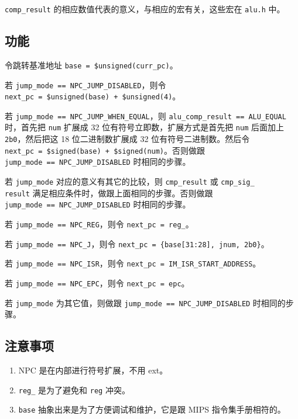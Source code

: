 \documentclass[12pt,AutoFakeBold,AutoFakeSlant]{article}
\providecommand{\tightlist}{%
  \setlength{\itemsep}{0pt}\setlength{\parskip}{0pt}}
\begin{document}
\texttt{comp\_result} 的相应数值代表的意义，与相应的宏有关，这些宏在
\texttt{alu.h} 中。

\hypertarget{ux529fux80fd}{%
\subsection{功能}\label{ux529fux80fd}}

令跳转基准地址 \texttt{base\ =\ \$unsigned(curr\_pc)}。

若 \texttt{jump\_mode\ ==\ NPC\_JUMP\_DISABLED}，则令
\texttt{next\_pc\ =\ \$unsigned(base)\ +\ \$unsigned(4)}。

若 \texttt{jump\_mode\ ==\ NPC\_JUMP\_WHEN\_EQUAL}，则
\texttt{alu\_comp\_result\ ==\ ALU\_EQUAL} 时，首先把 \texttt{num}
扩展成 32 位有符号立即数，扩展方式是首先把 \texttt{num} 后面加上
\texttt{2\textquotesingle{}b0}，然后把这 18 位二进制数扩展成 32
位有符号二进制数。然后令
\texttt{next\_pc\ =\ \$signed(base)\ +\ \$signed(num)}。否则做跟
\texttt{jump\_mode\ ==\ NPC\_JUMP\_DISABLED} 时相同的步骤。

若 \texttt{jump\_mode} 对应的意义有其它的比较，则 \texttt{cmp\_result}
或 \texttt{cmp\_sig\_\\result} 满足相应条件时，做跟上面相同的步骤。否则做跟
\texttt{jump\_mode\ ==\ NPC\_JUMP\_DISABLED} 时相同的步骤。

若 \texttt{jump\_mode\ ==\ NPC\_REG}，则令 \texttt{next\_pc\ =\ reg\_}。

若 \texttt{jump\_mode\ ==\ NPC\_J}，则令
\texttt{next\_pc\ =\ \{base{[}31:28{]},\ jnum,\ 2\textquotesingle{}b0\}}。

若 \texttt{jump\_mode\ ==\ NPC\_ISR}，则令
\texttt{next\_pc\ =\ IM\_ISR\_START\_ADDRESS}。

若 \texttt{jump\_mode\ ==\ NPC\_EPC}，则令 \texttt{next\_pc\ =\ epc}。

若 \texttt{jump\_mode} 为其它值，则做跟
\texttt{jump\_mode\ ==\ NPC\_JUMP\_DISABLED} 时相同的步骤。

\hypertarget{ux6ce8ux610fux4e8bux9879}{%
\subsection{注意事项}\label{ux6ce8ux610fux4e8bux9879}}

\begin{enumerate}
\def\labelenumi{\arabic{enumi}.}
\tightlist
\item
  NPC 是在内部进行符号扩展，不用 ext。
\item
  \texttt{reg\_} 是为了避免和 \texttt{reg} 冲突。
\item
  \texttt{base} 抽象出来是为了方便调试和维护，它是跟 MIPS
  指令集手册相符的。
\end{enumerate}
\end{document}

